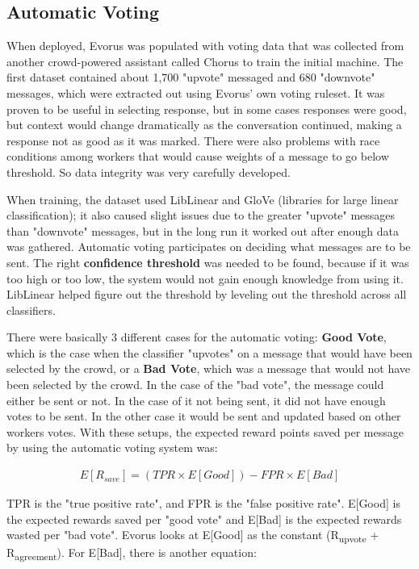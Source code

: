 \documentclass[letterpaper, 10 pt, conference]{IEEEtran}
\begin{document}
\subsection{Automatic Voting}
When deployed, Evorus was populated with voting data that was collected from another crowd-powered assistant called Chorus to train the initial machine. The first dataset contained about 1,700 "upvote" messaged and 680 "downvote" messages, which were extracted out using Evorus' own voting ruleset. It was proven to be useful in selecting response, but in some cases responses were good, but context would change dramatically as the conversation continued, making a response not as good as it was marked. There were also problems with race conditions among workers that would cause weights of a message to go below threshold. So data integrity was very carefully developed. \par When training, the dataset used LibLinear and GloVe (libraries for large linear classification); it also caused slight issues due to the greater "upvote" messages than "downvote" messages, but in the long run it worked out after enough data was gathered. Automatic voting participates on deciding what messages are to be sent. The right \textbf{confidence threshold} was needed to be found, because if it was too high or too low, the system would not gain enough knowledge from using it. LibLinear helped figure out the threshold by leveling out the threshold across all classifiers. \par There were basically 3 different cases for the automatic voting: \textbf{Good Vote}, which is the case when the classifier "upvotes" on a message that would have been selected by the crowd, or a \textbf{Bad Vote}, which was a message that would not have been selected by the crowd. In the case of the "bad vote", the message could either be sent or not. In the case of it not being sent, it did not have enough votes to be sent. In the other case it would be sent and updated based on other workers votes. With these setups, the expected reward points saved per message by using the automatic voting system was:

\begin{equation}
\begin{gathered}
E[R_{save}] = (TPR \times E[Good]) - FPR \times E[Bad]
\end{gathered}
\end{equation}

TPR is the "true positive rate", and FPR is the "false positive rate". E[Good] is the expected rewards saved per "good vote" and E[Bad] is the expected rewards wasted per "bad vote". Evorus looks at E[Good] as the constant (R\textsubscript{upvote} + R\textsubscript{agreement}). For E[Bad], there is another equation:
\end{document}
